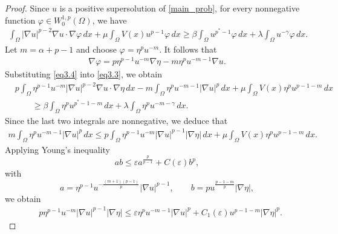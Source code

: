 \documentclass[12pt]{extarticle}
\theoremstyle{definition}
\theoremstyle{remark}
\theoremstyle{definition}
\numberwithin{equation}{section}
\numberwithin{equation}{section}
\begin{document}
			\begin{proof}
				Since $u$ is a positive supersolution of \eqref{main_prob}, for every
				nonnegative function
				$\varphi\in W_0^{1,p}(\Omega)$, we have
				\begin{align}
					\int_{\Omega}
					|\nabla u|^{p-2}
					\nabla u\cdot\nabla\varphi\,dx
					+
					\mu
					\int_{\Omega}
					V(x)u^{p-1}\varphi\,dx
					\ge
					\beta
					\int_{\Omega}
					u^{p^*-1}\varphi\,dx
					+
					\lambda
					\int_{\Omega}
					u^{-\gamma}\varphi\,dx.
					\label{eq3.3}
				\end{align}				
				Let $m=\alpha+p-1$ and choose $\varphi=\eta^pu^{-m}$. It follows that
				\begin{align}
					\nabla\varphi =
					p\eta^{p-1}u^{-m}\nabla\eta
					- m\eta^pu^{-m-1}\nabla u.
					\label{eq3.4}
				\end{align}				
				Substituting \eqref{eq3.4} into \eqref{eq3.3}, we obtain
				\begin{align}
					&
					p
					\int_{\Omega}
					\eta^{p-1}
					u^{-m}
					|\nabla u|^{p-2}
					\nabla u\cdot\nabla\eta\,dx
					-
					m
					\int_{\Omega}
					\eta^pu^{-m-1}
					|\nabla u|^p\,dx
					+
					\mu
					\int_{\Omega}
					V(x)\eta^pu^{p-1-m}\,dx
					\nonumber\\
					&
					\qquad\ge
					\beta
					\int_{\Omega}
					\eta^pu^{p^*-1-m}\,dx
					+
					\lambda
					\int_{\Omega}
					\eta^pu^{-m-\gamma}\,dx.
					\label{eq3.5}
				\end{align}				
				Since the last two integrals are nonnegative, we deduce that
				\begin{align}
					m
					\int_{\Omega}
					\eta^pu^{-m-1}
					|\nabla u|^p\,dx
					\le
					p
					\int_{\Omega}
					\eta^{p-1}
					u^{-m}
					|\nabla u|^{p-1}
					|\nabla\eta|\,dx
					+
					\mu
					\int_{\Omega}
					V(x)\eta^pu^{p-1-m}\,dx.
					\label{eq3.6}
				\end{align}				
				Applying Young's inequality
				\[
				ab
				\le
				\varepsilon a^{\frac{p}{p-1}}
				+
				C(\varepsilon)b^p,
				\]
				with
				\[
				a=
				\eta^{p-1}
				u^{-\frac{(m+1)(p-1)}{p}}
				|\nabla u|^{p-1},
				\qquad
				b=
				pu^{\frac{p-1-m}{p}}
				|\nabla\eta|,
				\]
				we obtain
				\begin{align}
					&
					p
					\eta^{p-1}
					u^{-m}
					|\nabla u|^{p-1}
					|\nabla\eta|
					\le
					\varepsilon
					\eta^p
					u^{-m-1}
					|\nabla u|^p
					+
					C_1(\varepsilon)
					u^{p-1-m}
					|\nabla\eta|^p.
					\label{eq3.7}
				\end{align}	

\end{proof}
\end{document}
